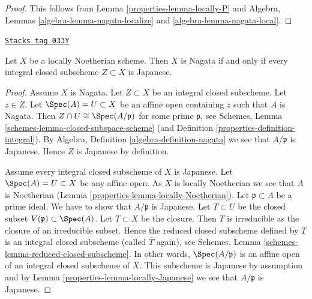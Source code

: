 \begin{proof}

This follows from Lemma \ref{properties-lemma-locally-P} and
Algebra, Lemmas \ref{algebra-lemma-nagata-localize} and
\ref{algebra-lemma-nagata-local}.
\end{proof}

\begin{lemma}
\label{properties-lemma-characterize-nagata}
\href{https://stacks.math.columbia.edu/tag/033Y}{\texttt{Stacks tag 033Y}}

Let $X$ be a locally Noetherian scheme.
Then $X$ is Nagata if and only if every integral closed subscheme
$Z \subset X$ is Japanese.
\end{lemma}

\begin{proof}

Assume $X$ is Nagata. Let $Z \subset X$ be an integral closed subscheme.
Let $z \in Z$.
Let $\Spec(A) = U \subset X$ be an affine open containing $z$
such that $A$ is Nagata. Then
$Z \cap U \cong \Spec(A/\mathfrak p)$ for some prime $\mathfrak p$,
see Schemes, Lemma \ref{schemes-lemma-closed-subspace-scheme} (and
Definition \ref{properties-definition-integral}). By
Algebra, Definition \ref{algebra-definition-nagata} we see
that $A/\mathfrak p$ is Japanese. Hence $Z$ is Japanese by definition.

\medskip\noindent
Assume every integral closed subscheme of $X$ is Japanese.
Let $\Spec(A) = U \subset X$ be any affine open.
As $X$ is locally Noetherian we see that $A$ is Noetherian
(Lemma \ref{properties-lemma-locally-Noetherian}). Let $\mathfrak p \subset A$
be a prime ideal. We have to show that $A/\mathfrak p$ is Japanese.
Let $T \subset U$ be the closed subset $V(\mathfrak p) \subset \Spec(A)$.
Let $\overline{T} \subset X$ be the closure. Then $\overline{T}$ is
irreducible as the closure of an irreducible subset. Hence the reduced
closed subscheme defined by $\overline{T}$ is an integral closed
subscheme (called $\overline{T}$ again), see
Schemes, Lemma \ref{schemes-lemma-reduced-closed-subscheme}.
In other words, $\Spec(A/\mathfrak p)$ is an affine
open of an integral closed subscheme of $X$. This subscheme is Japanese
by assumption and by Lemma \ref{properties-lemma-locally-Japanese} we see that
$A/\mathfrak p$ is Japanese.
\end{proof}

